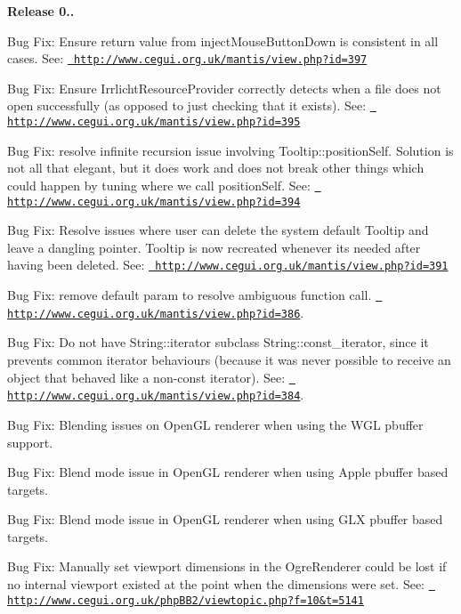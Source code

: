 {\bfseries{Release 0..}}
\begin{DoxyItemize}
\item Bug Fix\+: Ensure return value from inject\+Mouse\+Button\+Down is consistent in all cases. See\+: \href{http://www.cegui.org.uk/mantis/view.php?id=397}{\texttt{ http\+://www.\+cegui.\+org.\+uk/mantis/view.\+php?id=397}}
\item Bug Fix\+: Ensure Irrlicht\+Resource\+Provider correctly detects when a file does not open successfully (as opposed to just checking that it exists). See\+: \href{http://www.cegui.org.uk/mantis/view.php?id=395}{\texttt{ http\+://www.\+cegui.\+org.\+uk/mantis/view.\+php?id=395}}
\item Bug Fix\+: resolve infinite recursion issue involving Tooltip\+::position\+Self. Solution is not all that elegant, but it does work and does not break other things which could happen by \textquotesingle{}tuning\textquotesingle{} where we call position\+Self. See\+: \href{http://www.cegui.org.uk/mantis/view.php?id=394}{\texttt{ http\+://www.\+cegui.\+org.\+uk/mantis/view.\+php?id=394}}
\item Bug Fix\+: Resolve issues where user can delete the system default Tooltip and leave a dangling pointer. Tooltip is now recreated whenever it\textquotesingle{}s needed after having been deleted. See\+: \href{http://www.cegui.org.uk/mantis/view.php?id=391}{\texttt{ http\+://www.\+cegui.\+org.\+uk/mantis/view.\+php?id=391}}
\item Bug Fix\+: remove default param to resolve ambiguous function call. \href{http://www.cegui.org.uk/mantis/view.php?id=386}{\texttt{ http\+://www.\+cegui.\+org.\+uk/mantis/view.\+php?id=386}}.
\item Bug Fix\+: Do not have String\+::iterator subclass String\+::const\+\_\+iterator, since it prevents common iterator behaviours (because it was never possible to receive an object that behaved like a non-\/const iterator). See\+: \href{http://www.cegui.org.uk/mantis/view.php?id=384}{\texttt{ http\+://www.\+cegui.\+org.\+uk/mantis/view.\+php?id=384}}.
\item Bug Fix\+: Blending issues on Open\+GL renderer when using the W\+GL pbuffer support.
\item Bug Fix\+: Blend mode issue in Open\+GL renderer when using Apple pbuffer based targets.
\item Bug Fix\+: Blend mode issue in Open\+GL renderer when using G\+LX pbuffer based targets.
\item Bug Fix\+: Manually set viewport dimensions in the Ogre\+Renderer could be lost if no internal viewport existed at the point when the dimensions were set. See\+: \href{http://www.cegui.org.uk/phpBB2/viewtopic.php?f=10&t=5141}{\texttt{ http\+://www.\+cegui.\+org.\+uk/php\+B\+B2/viewtopic.\+php?f=10\&t=5141}}

\end{DoxyItemize}
